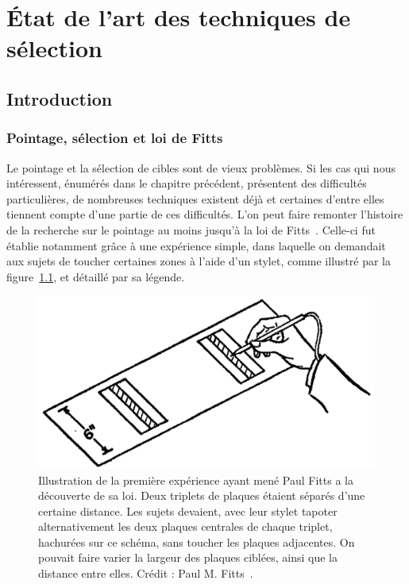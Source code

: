 
\chapter[État de l'art des techniques de sélection]{État de l'art des techniques de sélection}
\minitoc
\label{chap2}
\cleardoublepage

\section{Introduction}
	\subsection{Pointage, sélection et loi de Fitts}
	Le pointage et la sélection de cibles sont de vieux problèmes. Si les cas qui nous intéressent, énumérés dans le chapitre précédent, présentent des difficultés particulières, de nombreuses techniques existent déjà et certaines d'entre elles tiennent compte d'une partie de ces difficultés. L'on peut faire remonter l'histoire de la recherche sur le pointage au moins jusqu'à la loi de Fitts~\cite{fitts1954information}. Celle-ci fut établie notamment grâce à une expérience simple, dans laquelle on demandait aux sujets de toucher certaines zones à l'aide d'un stylet, comme illustré par la figure~\ref{fig:fitts}, et détaillé par sa légende.
	
	\begin{figure}[H]
		\centering
		\includegraphics[width=\textwidth]{figures/ch2/fitts}
		\caption[Expérience de Paul M. Fitts.]{Illustration de la première expérience ayant mené Paul Fitts a la découverte de sa loi. Deux triplets de plaques étaient séparés d'une certaine distance. Les sujets devaient, avec leur stylet \og tapoter \fg{} alternativement les deux plaques centrales de chaque triplet, hachurées sur ce schéma, sans toucher les plaques adjacentes. On pouvait faire varier la largeur des plaques ciblées, ainsi que la distance entre elles. Crédit : Paul M. Fitts~\cite{fitts1954information}.}
		\label{fig:fitts}
	\end{figure}
	
